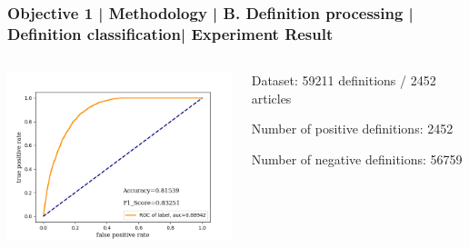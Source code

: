 \documentclass{beamer}
\begin{document}
\begin{frame}
\frametitle{Objective 1 | Methodology | B. Definition processing | Definition classification| Experiment Result}



\begin{columns}
		\begin{column}{.55\textwidth}
		\includegraphics[width=70mm]{Figure_1.png}
	\end{column}
	\begin{column}{.35\textwidth}
		\begin{itemize}
		{\scriptsize 	\item Dataset: 59211 definitions /  2452 articles
		\item Number of positive definitions: 2452
		\item Number of negative definitions: 56759}
		\end{itemize}
		
	\end{column}

	
	
\end{columns}



\end{frame}
\end{document}
